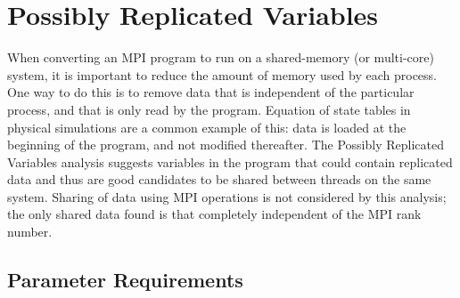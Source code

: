 %
%

\section{Possibly Replicated Variables}
\label{PossiblyReplicatedVariables::overview}

When converting an MPI program to run on a shared-memory (or multi-core)
system, it is important to reduce the amount of memory used by each
process.  One way to do this is to remove data that is independent of the
particular process, and that is only read by the program.  Equation of
state tables in physical simulations are a common example of this: data is
loaded at the beginning of the program, and not modified thereafter.  The
Possibly Replicated Variables analysis suggests variables in the program
that could contain replicated data and thus are good candidates to be
shared between threads on the same system.  Sharing of data using MPI
operations is not considered by this analysis; the only shared data found
is that completely independent of the MPI rank number.

\subsection{Parameter Requirements}

